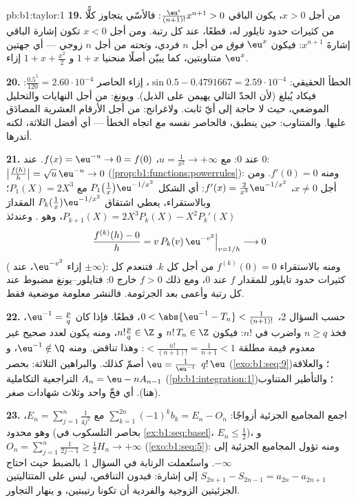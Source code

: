 \begin{solution}{pb:b1:taylor:1}
\textbf{19.} من أجل $x > 0$، يكون الباقي $\frac{\eu^{c}}
{(n+1)!}x^{n+1} > 0$: فالأسّي يتجاوز كلًّا من كثيرات حدود
تايلور له، قطعًا، عند كل رتبة. ومن أجل $x < 0$ تكون
إشارة الباقي إشارةَ $x^{n+1}$: فيكون $\eu^x$
\emph{فوق}  من أجل $n$ فردي، و\emph{تحته} من أجل
$n$ زوجي --- أي جهتين متناوبتين، كما يبيّن أصلًا منحنيا $1 + x$ و $1
+ x + \frac{x^2}{2}$ إزاء $\eu^x$.

\textbf{20.} الخطأ الحقيقي: $\sin 0.5 - 0.4791667 =
2.59\cdot10^{-4}$، إزاء الحاصر $\frac{0.5^5}{120} =
2.60\cdot10^{-4}$: فيكاد يُبلغ (لأن الحدّ التالي يهيمن على
الذيل). ويونغ: من أجل النهايات والتحليل الموضعي، حيث لا حاجة إلى أيّ
ثابت. ولاغرانج: من أجل الأرقام العشرية المصادَق عليها. والمتناوب: حين
ينطبق، فالحاصر نفسه \emph{مع} اتجاه الخطأ
--- أي أفضل الثلاثة، لكنه أندرها.

\textbf{21.}  عند $0$: مع $u = \frac{1}{x^2} \to
+\infty$، $f(x) = \eu^{-u} \to 0 = f(0)$.  عند $0$:
$\bigl|\frac{f(h)}{h}\bigr| = \sqrt u\,\eu^{-u} \to 0$
(\cref{prop:b1:functions:powerrules}): ومنه $f'(0) = 0$. ومن أجل $x \neq
0$، $f'(x) = \frac{2}{x^3}\eu^{-1/x^2}$: أي الشكل
$P_1\bigl(\frac1x\bigr)\eu^{-1/x^2}$ مع $P_1(X) = 2X^3$؛
وبالاستقراء، يعطي اشتقاق $P_k(\frac1x)\eu^{-1/x^2}$ المقدارَ
$P_{k+1}(X) = 2X^3 P_k(X) - X^2 P_k'(X)$، وهو . وعندئذ
\[
\frac{f^{(k)}(h) - 0}{h} = v\,P_k(v)\,\eu^{-v^2}
\Big|_{v = 1/h} \longrightarrow 0
\]
( إزاء $\eu^{-v^2}$،  عند
$\pm\infty$): ومنه بالاستقراء $f^{(k)}(0) = 0$ من أجل كل $k$. فتنعدم كل
كثيرات حدود تايلور للمقدار $f$ عند $0$، ومع ذلك $f > 0$ خارج $0$:
فتايلور--يونغ مضبوط عند كل رتبة وأعمى بعد
الجرثومة. فالنشر معلومة موضعية فقط.

\textbf{22.} حسب السؤال 2، $0 < \abs{\eu^{-1} - T_n} <
\frac{1}{(n+1)!}$، قطعًا. فإذا كان $\eu^{-1} = \frac pq$، فخذ $n
\geq q$ واضرب في $n!$: فيكون $n!\,T_n \in \Z$ و $n!\frac pq
\in \Z$، ومنه يكون لعدد صحيح غير معدوم قيمة مطلقة $<
\frac{n!}{(n+1)!} = \frac{1}{n+1} < 1$: وهذا تناقض. ومنه
$\eu^{-1} \notin \Q$، و $\eu = \frac{1}{\eu^{-1}}$ أصمّ
كذلك. والبراهين الثلاثة:  بحصر
$q!\,\eu$ (\cref{exo:b1:seq:9})؛ والعلاقة التراجعية التكاملية $A_n =
\eu - nA_{n-1}$ (\cref{pb:b1:integration:1})؛ والتأطير
المتناوب (هنا). أي فخّ واحد وثلاث شهادات صغر.

\textbf{23.} اجمع المجاميع الجزئية أزواجًا: $\sum_{k=1}^{2n}
(-1)^k b_k = E_n - O_n$ مع $E_n = \sum_{j=1}^{n}
\frac{1}{4j^2}$، وهو محدود (بحاصر التلسكوب في
\cref{ex:b1:seq:basel}، $E_n \leq \frac12$)، و $O_n =
\sum_{j=1}^{n}\frac{1}{2j-1} \geq \frac12 H_n \to +\infty$
(\cref{exo:b1:seq:5}): ومنه تؤول المجاميع الجزئية إلى $-\infty$.
واستُعملت الرتابة في السؤال 1 بالضبط حيث احتاج $S_{2n+1} -
S_{2n-1} = a_{2n} - a_{2n+1}$ إلى إشارة: فبدون التناقص،
ليس على المتتاليتين الجزئيتين الزوجية والفردية أن تكونا رتيبتين، و
ينهار التجاور.


\end{solution}
